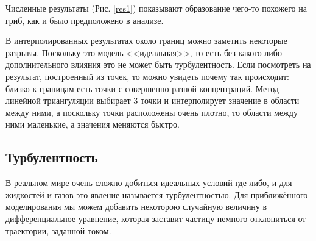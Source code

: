     Численные результаты (Рис. \ref{res1}) показывают образование чего-то похожего на гриб, как и было предположено в анализе. 
    
    В интерполированных результатах около границ можно заметить некоторые разрывы. Поскольку это модель <<идеальная>>, то есть без какого-либо дополнительного влияния это не может быть турбулентность. Если посмотреть на результат, построенный из точек, то можно увидеть почему так происходит: близко к границам есть точки с совершенно разной концентраций. Метод линейной триангуляции выбирает 3 точки и интерполирует значение в области между ними, а поскольку точки расположены очень плотно, то области между ними маленькие, а значения меняются быстро.


    \subsection{Турбулентность}
        В реальном мире очень сложно добиться идеальных условий где-либо, и для жидкостей и газов это явление называется турбулентностью. Для приближённого моделирования мы можем добавить некоторою случайную величину в дифференциальное уравнение, которая заставит частицу немного отклониться от траектории, заданной током.    
